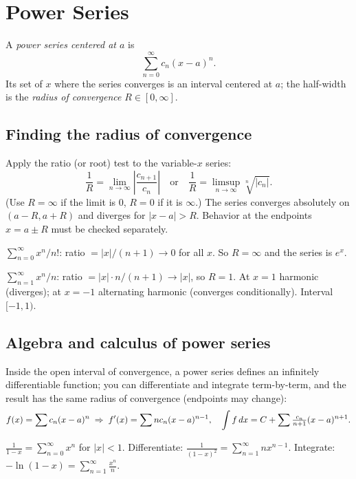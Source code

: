 \section{Power Series}

\begin{definition}
A \emph{power series centered at $a$} is
\[ \sum_{n=0}^\infty c_n (x - a)^n. \]
Its set of $x$ where the series converges is an interval centered at $a$; the half-width is the
\emph{radius of convergence} $R \in [0, \infty]$.
\end{definition}

\subsection{Finding the radius of convergence}
Apply the ratio (or root) test to the variable-$x$ series:
\[ \frac{1}{R} = \lim_{n\to\infty} \left| \frac{c_{n+1}}{c_n} \right|
\quad \text{or} \quad
\frac{1}{R} = \limsup_{n\to\infty} \sqrt[n]{|c_n|}. \]
(Use $R = \infty$ if the limit is $0$, $R = 0$ if it is $\infty$.) The series converges
absolutely on $(a - R, a + R)$ and diverges for $|x - a| > R$. Behavior at the
endpoints $x = a \pm R$ must be checked separately.

\begin{example}
$\sum_{n=0}^\infty x^n / n!$: ratio $= |x| / (n+1) \to 0$ for all $x$. So $R = \infty$ and the
series is $e^x$.
\end{example}

\begin{example}
$\sum_{n=1}^\infty x^n / n$: ratio $= |x| \cdot n/(n+1) \to |x|$, so $R = 1$. At $x = 1$ harmonic
(diverges); at $x = -1$ alternating harmonic (converges conditionally). Interval $[-1, 1)$.
\end{example}

\subsection{Algebra and calculus of power series}
Inside the open interval of convergence, a power series defines an infinitely differentiable
function; you can differentiate and integrate term-by-term, and the result has the same radius
of convergence (endpoints may change):
\[
f(x) = \sum c_n (x-a)^n
\;\Rightarrow\;
f'(x) = \sum n c_n (x-a)^{n-1},
\quad
\int f \,dx = C + \sum \tfrac{c_n}{n+1} (x-a)^{n+1}.
\]

\begin{example}[Trick]
$\displaystyle \frac{1}{1 - x} = \sum_{n=0}^\infty x^n$ for $|x| < 1$. Differentiate:
$\displaystyle \frac{1}{(1-x)^2} = \sum_{n=1}^\infty n x^{n-1}$.
Integrate: $\displaystyle -\ln(1 - x) = \sum_{n=1}^\infty \frac{x^n}{n}$.
\end{example}

